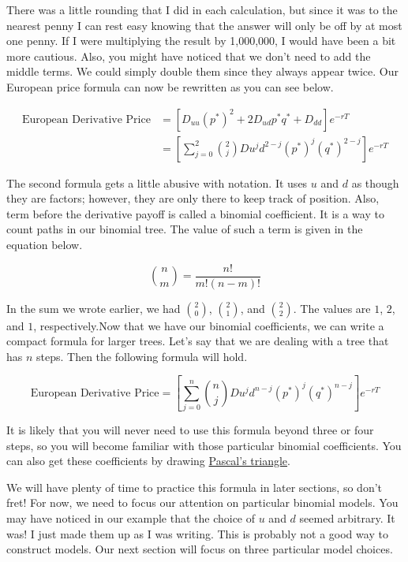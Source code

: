 \documentclass{ximera}
\begin{document}
There was a little rounding that I did in each calculation, but since it was to the nearest penny I can rest easy knowing that the answer will only be off by at most one penny. If I were multiplying the result by 1,000,000, I would have been a bit more cautious. Also, you might have noticed that we don't need to add the middle terms. We could simply double them since they always appear twice. Our European price formula can now be rewritten as you can see below. 

\begin{align*}
\text{European Derivative Price}	&=[D_{uu}(p^*)^2+2D_{ud}p^*q^*+D_{dd}]e^{-rT}\\
					&=\left[\sum_{j=0}^2 \binom{2}{j}Du^jd^{2-j}(p^*)^j(q^*)^{2-j}\right]e^{-rT}
\end{align*}

The second formula gets a little abusive with notation. It uses $u$ and $d$ as though they are factors; however, they are only there to keep track of position. Also, term before the derivative payoff is called a binomial coefficient. It is a way to count paths in our binomial tree. The value of such a term is given in the equation below. 

\begin{equation*}
\binom{n}{m}=\frac{n!}{m!(n-m)!}
\end{equation*}

In the sum we wrote earlier, we had $\binom{2}{0}$, $\binom{2}{1}$, and $\binom{2}{2}$. The values are $1$, $2$, and $1$, respectively.Now that we have our binomial coefficients, we can write a compact formula for larger trees. Let's say that we are dealing with a tree that has $n$ steps. Then the following formula will hold.

\begin{equation*}
\text{European Derivative Price}=\left[\sum_{j=0}^n \binom{n}{j}Du^jd^{n-j}(p^*)^j(q^*)^{n-j}\right]e^{-rT}
\end{equation*}

It is likely that you will never need to use this formula beyond three or four steps, so you will become familiar with those particular binomial coefficients. You can also get these coefficients by drawing \href{https://en.wikipedia.org/wiki/Pascal's_triangle}{Pascal's triangle}.

We will have plenty of time to practice this formula in later sections, so don't fret! For now, we need to focus our attention on particular binomial models. You may have noticed in our example that the choice of $u$ and $d$ seemed arbitrary. It was! I just made them up as I was writing. This is probably not a good way to construct models. Our next section will focus on three particular model choices.
\end{document}

